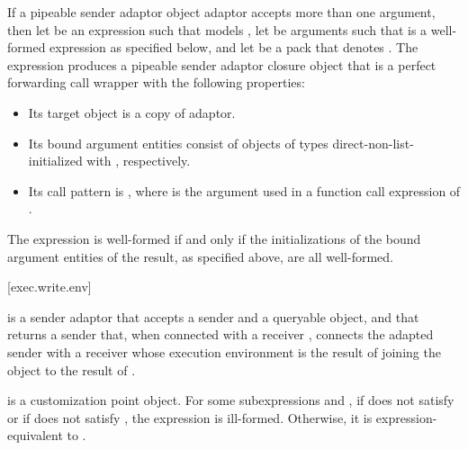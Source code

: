 \pnum
If a pipeable sender adaptor object adaptor accepts more than one argument,
then let  be an expression
such that  models ,
let  be arguments
such that  is a well-formed expression
as specified below, and
let  be a pack that denotes .
The expression  produces
a pipeable sender adaptor closure object 
that is a perfect forwarding call wrapper with the following properties:
\begin{itemize}
\item
Its target object is a copy of adaptor.
\item
Its bound argument entities  consist of
objects of types  direct-non-list-initialized with
, respectively.
\item
Its call pattern is ,
where  is
the argument used in a function call expression of .
\end{itemize}
The expression  is well-formed if and only if
the initializations of the bound argument entities of the result,
as specified above, are all well-formed.

[exec.write.env]{}

\pnum
{} is a sender adaptor
that accepts a sender and a queryable object, and
that returns a sender that,
when connected with a receiver ,
connects the adapted sender with a receiver
whose execution environment is the result of
joining the  object
to the result of .

\pnum
{} is a customization point object.
For some subexpressions  and ,
if  does not satisfy  or
if  does not satisfy ,
the expression  is ill-formed.
Otherwise, it is expression-equivalent to
.

